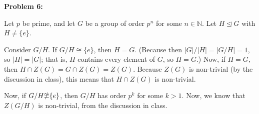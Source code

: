 \documentclass[a4paper,12pt]{article}
\newcommand{\shunt}{\vspace{20mm}}
\newcommand{\absval}[1]{\lvert #1 \rvert}
\newcommand{\N}{\mathbb{N}}
\newcommand{\subgp}{\mathrel{\unlhd}}
\begin{document}
{\bf Problem 6:}

Let $p$ be prime, and let $G$ be a group of order $p^n$ for some $n \in \N$. Let $H \subgp G$ with $H \neq \{e\}$.

Consider $G/H$. If $G/H \cong \{e\}$, then $H = G$. (Because then $\absval{G}/\absval{H} = \absval{G/H}=1$, so $\absval{H} = \absval{G}$; that is, $H$ contains every element of $G$, so $H = G$.) Now, if $H=G$, then $H \cap Z(G) = G \cap Z(G) =  Z(G)$. Because $Z(G)$ is non-trivial (by the discussion in class), this means that $H \cap Z(G)$ is non-trivial. 

Now, if $G/H \slashed{\cong} \{e\}$, then $G/H$ has order $p^k$ for some $k > 1$. Now, we know that $Z(G/H)$ is non-trivial, from the discussion in class. 

\shunt
\end{document}
